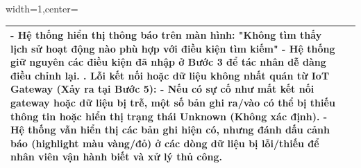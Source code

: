 \begin{adjustbox}{width=1\textwidth,center=\textwidth}
\begin{tabular}{|>{\centering\arraybackslash}m{3.5cm}|m{13.2cm}|}
- Hệ thống hiển thị thông báo trên màn hình: "Không tìm thấy lịch sử hoạt động nào phù hợp với điều kiện tìm kiếm" \newline
- Hệ thống giữ nguyên các điều kiện đã nhập ở Bước 3 để tác nhân dễ dàng điều chỉnh lại. \newline
2. Lỗi kết nối hoặc dữ liệu không nhất quán từ IoT Gateway (Xảy ra tại Bước 5): \newline
- Nếu có sự cố như mất kết nối gateway hoặc dữ liệu bị trễ, một số bản ghi ra/vào có thể bị thiếu thông tin hoặc hiển thị trạng thái Unknown (Không xác định). \newline
- Hệ thống vẫn hiển thị các bản ghi hiện có, nhưng đánh dấu cảnh báo (highlight màu vàng/đỏ) ở các dòng dữ liệu bị lỗi/thiếu để nhân viên vận hành biết và xử lý thủ công.\\ \hline
\end{tabular}
\end{adjustbox}